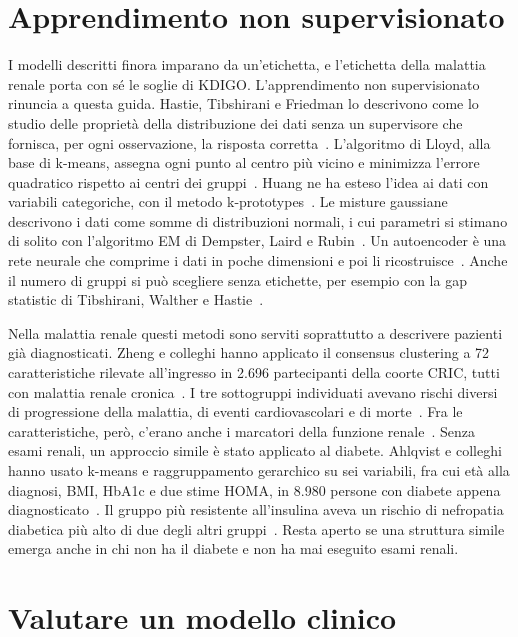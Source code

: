 \documentclass[a4paper, 12pt, oneside]{book}
\begin{document}
\section{Apprendimento non supervisionato}

I modelli descritti finora imparano da un'etichetta, e l'etichetta della malattia renale porta con sé le soglie di KDIGO. L'apprendimento non supervisionato rinuncia a questa guida. Hastie, Tibshirani e Friedman lo descrivono come lo studio delle proprietà della distribuzione dei dati senza un supervisore che fornisca, per ogni osservazione, la risposta corretta~\cite{hastie_elements_2009}. 
L'algoritmo di Lloyd, alla base di k-means, assegna ogni punto al centro più vicino e minimizza l'errore quadratico rispetto ai centri dei gruppi~\cite{lloyd_least_1982}. Huang ne ha esteso l'idea ai dati con variabili categoriche, con il metodo k-prototypes~\cite{huang_extensions_1998}. Le misture gaussiane descrivono i dati come somme di distribuzioni normali, i cui parametri si stimano di solito con l'algoritmo EM di Dempster, Laird e Rubin~\cite{dempster_maximum_1977}. Un autoencoder è una rete neurale che comprime i dati in poche dimensioni e poi li ricostruisce~\cite{hinton_reducing_2006}. Anche il numero di gruppi si può scegliere senza etichette, per esempio con la gap statistic di Tibshirani, Walther e Hastie~\cite{tibshirani_estimating_2001}.

Nella malattia renale questi metodi sono serviti soprattutto a descrivere pazienti già diagnosticati. Zheng e colleghi hanno applicato il consensus clustering a 72 caratteristiche rilevate all'ingresso in 2.696 partecipanti della coorte CRIC, tutti con malattia renale cronica~\cite{zheng_subtyping_2021}. I tre sottogruppi individuati avevano rischi diversi di progressione della malattia, di eventi cardiovascolari e di morte~\cite{zheng_subtyping_2021}.
Fra le caratteristiche, però, c'erano anche i marcatori della funzione renale~\cite{zheng_subtyping_2021}. Senza esami renali, un approccio simile è stato applicato al diabete. Ahlqvist e colleghi hanno usato k-means e raggruppamento gerarchico su sei variabili, fra cui età alla diagnosi, BMI, HbA1c e due stime HOMA, in 8.980 persone con diabete appena diagnosticato~\cite{ahlqvist_novel_2018}. Il gruppo più resistente all'insulina aveva un rischio di nefropatia diabetica più alto di due degli altri gruppi~\cite{ahlqvist_novel_2018}. Resta aperto se una struttura simile emerga anche in chi non ha il diabete e non ha mai eseguito esami renali.

\section{Valutare un modello clinico}
\end{document}
